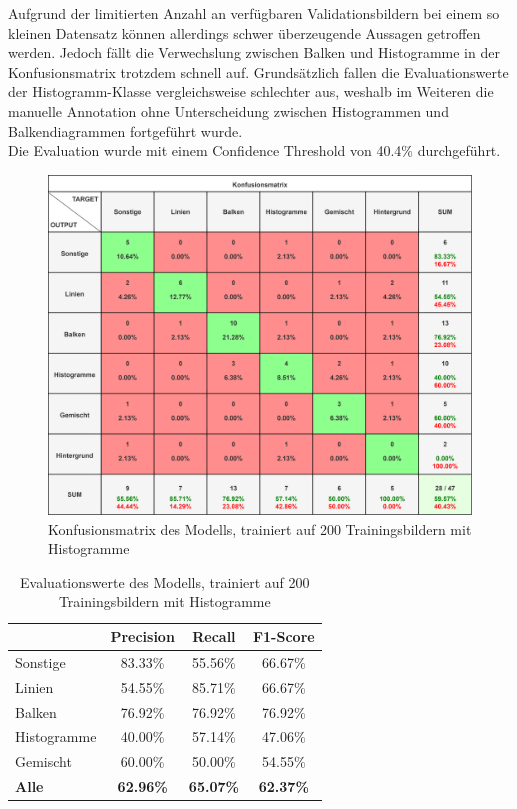 Aufgrund der limitierten Anzahl an verfügbaren Validationsbildern bei einem so kleinen Datensatz können allerdings schwer überzeugende Aussagen getroffen werden.
Jedoch fällt die Verwechslung zwischen Balken und Histogramme in der Konfusionsmatrix trotzdem schnell auf. Grundsätzlich fallen die Evaluationswerte der Histogramm-Klasse vergleichsweise schlechter aus, weshalb im Weiteren die manuelle Annotation ohne Unterscheidung zwischen Histogrammen und Balkendiagrammen fortgeführt wurde.
\\
Die Evaluation wurde mit einem Confidence Threshold von 40.4\% durchgeführt.
\begin{figure}[H]
    \centering
    \captionsetup{width=1\linewidth}
    \includegraphics[width=1\textwidth]{Experimente/img/detect/1_val@0.404_200_histo/konfusionsmatrix.png}
    \caption{ Konfusionsmatrix des Modells, trainiert auf 200 Trainingsbildern mit Histogramme}
    \label{fig:extraction_output}
\end{figure}

\begin{table}[H]
    \centering
    \begin{tabular}{|l|c|c|c|}
        \hline
        \rowcolor[HTML]{EFEFEF}
                      & Precision        & Recall           & F1-Score         \\ \hline
        Sonstige      & 83.33\%          & 55.56\%          & 66.67\%          \\ \hline
        Linien        & 54.55\%          & 85.71\%          & 66.67\%          \\ \hline
        Balken        & 76.92\%          & 76.92\%          & 76.92\%          \\ \hline
        Histogramme   & 40.00\%          & 57.14\%          & 47.06\%          \\ \hline
        Gemischt      & 60.00\%          & 50.00\%          & 54.55\%          \\ \hline
        \textbf{Alle} & \textbf{62.96\%} & \textbf{65.07\%} & \textbf{62.37\%} \\ \hline
    \end{tabular}
    \caption{Evaluationswerte des Modells, trainiert auf 200 Trainingsbildern mit Histogramme}
\end{table}



